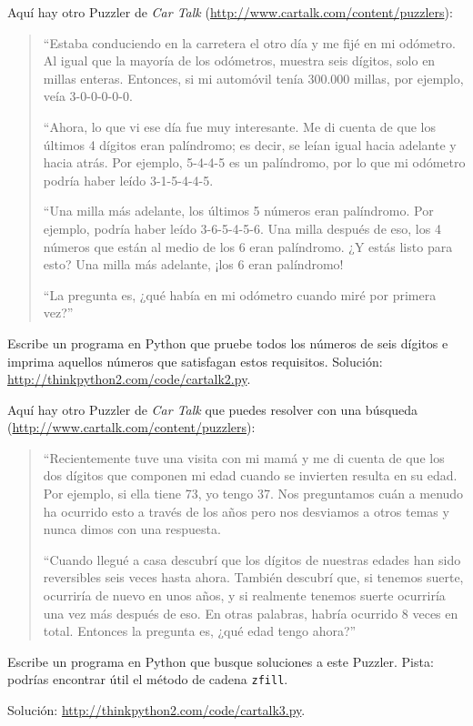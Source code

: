 \documentclass[10pt]{book}
\begin{document}
\begin{exercise}
Aquí hay otro Puzzler de {\em Car Talk}
(\url{http://www.cartalk.com/content/puzzlers}):

\begin{quote}
``Estaba conduciendo en la carretera el otro día y me fijé en
mi odómetro. Al igual que la mayoría de los odómetros, muestra seis dígitos,
solo en millas enteras. Entonces, si mi automóvil tenía 300.000
millas, por ejemplo, veía 3-0-0-0-0-0.

``Ahora, lo que vi ese día fue muy interesante. Me di cuenta de que los
últimos 4 dígitos eran palíndromo; es decir, se leían igual hacia adelante
y hacia atrás. Por ejemplo, 5-4-4-5 es un palíndromo, por lo que mi odómetro
podría haber leído 3-1-5-4-4-5.

``Una milla más adelante, los últimos 5 números eran palíndromo. Por ejemplo,
podría haber leído 3-6-5-4-5-6.  Una milla después de eso, los 4 números que están
al medio de los 6 eran palíndromo.  ¿Y estás listo para esto? Una milla más adelante,
¡los 6 eran palíndromo!

``La pregunta es, ¿qué había en mi odómetro cuando miré por primera vez?''
\end{quote}

Escribe un programa en Python que pruebe todos los números de seis dígitos e imprima
aquellos números que satisfagan estos requisitos.
Solución: \url{http://thinkpython2.com/code/cartalk2.py}.

\end{exercise}


\begin{exercise}
Aquí hay otro Puzzler de {\em Car Talk} que puedes resolver con una
búsqueda (\url{http://www.cartalk.com/content/puzzlers}):

\begin{quote}
``Recientemente tuve una visita con mi mamá y me di cuenta de que
los dos dígitos que componen mi edad cuando se invierten resulta en su
edad. Por ejemplo, si ella tiene 73, yo tengo 37. Nos preguntamos cuán a menudo ha
ocurrido esto a través de los años pero nos desviamos a otros temas y
nunca dimos con una respuesta.

``Cuando llegué a casa descubrí que los dígitos de nuestras edades han sido
reversibles seis veces hasta ahora. También descubrí que, si tenemos suerte,
ocurriría de nuevo en unos años, y si realmente tenemos suerte
ocurriría una vez más después de eso. En otras palabras, habría
ocurrido 8 veces en total. Entonces la pregunta es, ¿qué edad tengo ahora?''

\end{quote}

Escribe un programa en Python que busque soluciones a este Puzzler.
Pista: podrías encontrar útil el método de cadena {\tt zfill}.

Solución: \url{http://thinkpython2.com/code/cartalk3.py}.

\end{exercise}
\end{document}
